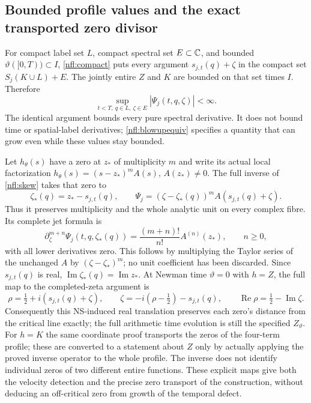 \subsection{Bounded profile values and the exact transported zero divisor}

For compact label set $L$, compact spectral set $E\subset\mathbb C$, and
bounded $\vartheta([0,T))\subset I$, \eqref{nfl:compact} puts every
argument $s_{j,t}(q)+\zeta$ in the compact set $S_j(K\cup L)+E$.
The jointly entire $Z$ and $K$ are bounded on that set times $I$.
Therefore
\[
 \sup_{t<T,\ q\in L,\ \zeta\in E}|\Psi_j(t,q,\zeta)|<\infty.
\]
The identical argument bounds every pure spectral derivative. It does
not bound time or spatial-label derivatives; \eqref{nfl:blowupequiv}
specifies a quantity that can grow even while these values stay bounded.

Let $h_\theta(s)$ have a zero at $z_*$ of multiplicity $m$ and write its
actual local factorization
$h_\theta(s)=(s-z_*)^m A(s)$, $A(z_*)\ne0$. The full inverse of
\eqref{nfl:skew} takes that zero to
\[
 \zeta_*(q)=z_*-s_{j,t}(q),\qquad
 \Psi_j=(\zeta-\zeta_*(q))^m A(s_{j,t}(q)+\zeta).
\]
Thus it preserves multiplicity and the whole analytic unit on every
complex fibre. Its complete jet formula is
\[
 \partial_\zeta^{m+n}\Psi_j(t,q,\zeta_*(q))
                 =\frac{(m+n)!}{n!}A^{(n)}(z_*),\qquad n\geq0,
\]
with all lower derivatives zero. This follows by multiplying the
Taylor series of the unchanged $A$ by $(\zeta-\zeta_*)^m$; no unit
coefficient has been discarded. Since $s_{j,t}(q)$ is real,
$\operatorname{Im}\zeta_*(q)=\operatorname{Im}z_*$. At Newman time
$\vartheta=0$ with $h=Z$, the full map to the completed-zeta argument is
\[
 \rho=\tfrac12+i(s_{j,t}(q)+\zeta),\qquad
 \zeta=-i(\rho-\tfrac12)-s_{j,t}(q),\qquad
 \operatorname{Re}\rho=\tfrac12-\operatorname{Im}\zeta.
\]
Consequently this NS-induced real translation preserves each zero's
distance from the critical line exactly; the full arithmetic time
evolution is still the specified $Z_\vartheta$. For $h=K$ the same
coordinate proof transports the zeros of the four-term profile; these
are converted to a statement about $Z$ only by actually applying the
proved inverse operator to the whole profile. The inverse does not
identify individual zeros of two different entire functions. These
explicit maps give both the velocity detection and the precise zero
transport of the construction, without deducing an off-critical zero
from growth of the temporal defect.
